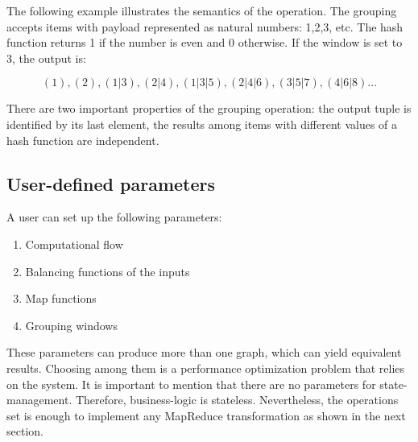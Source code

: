 The following example illustrates the semantics of the operation. The grouping accepts items with payload represented as natural numbers: 1,2,3, etc. The hash function returns 1 if the number is even and 0 otherwise. If the window is set to 3, the output is:

\[(1), (2), (1|3), (2|4), (1|3|5), (2|4|6), (3|5|7), (4|6|8)...\]

There are two important properties of the grouping operation: the output tuple is identified by its last element, the results among items with different values of a hash function are independent.

\subsection{User-defined parameters}

A user can set up the following parameters:

\begin{enumerate}
  \item{Computational flow}
  \item{Balancing functions of the inputs}
  \item{Map functions}
  \item{Grouping windows}
\end{enumerate}

These parameters can produce more than one graph, which can yield equivalent results. Choosing among them is a performance optimization problem that relies on the system.
It is important to mention that there are no parameters for state-management. Therefore, business-logic is stateless. Nevertheless, the operations set is enough to implement any MapReduce transformation as shown in the next section.
